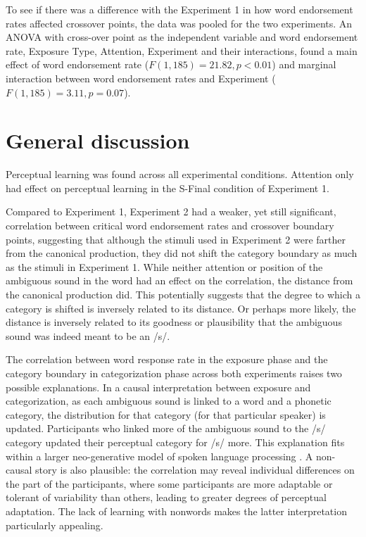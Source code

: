 To see if there was a difference with the Experiment 1 in how word endorsement rates affected crossover points, the data was pooled for the two experiments.  An ANOVA with cross-over point as the independent variable and word endorsement rate, Exposure Type, Attention, Experiment and their interactions, found a main effect of word endorsement rate ($F(1,185) = 21.82, p < 0.01$) and marginal interaction between word endorsement rates and Experiment ($F(1, 185) = 3.11, p = 0.07$).

\section{General discussion}

Perceptual learning was found across all experimental conditions. Attention only had effect on perceptual learning in the S-Final condition of Experiment 1.  

Compared to Experiment 1, Experiment 2 had a weaker, yet still significant, correlation between critical word endorsement rates and crossover boundary points, suggesting that although the stimuli used in Experiment 2 were farther from the canonical production, they did not shift the category boundary as much as the stimuli in Experiment 1.  While neither attention or position of the ambiguous sound in the word had an effect on the correlation, the distance from the canonical production did.  This potentially suggests that the degree to which a category is shifted is inversely related to its distance.  Or perhaps more likely, the distance is inversely related to its goodness or plausibility that the ambiguous sound was indeed meant to be an /s/.

The correlation between word response rate in the exposure phase and the category boundary in categorization phase across both experiments raises two possible explanations. 
In a causal interpretation between exposure and categorization, as each ambiguous sound is linked to a word and a phonetic category, the distribution for that category (for that particular speaker) is updated.
 Participants who linked more of the ambiguous sound to the /s/ category updated their perceptual category for /s/ more. 
This explanation fits within a larger neo-generative model of spoken language processing \citep{Pierrehumbert2002}.  
A non-causal story is also plausible:  the correlation may reveal individual differences on the part of the participants, where some participants are more adaptable or tolerant of variability than others, leading to greater degrees of perceptual adaptation. 
The lack of learning with nonwords \citep{Norris2003} makes the latter interpretation particularly appealing.